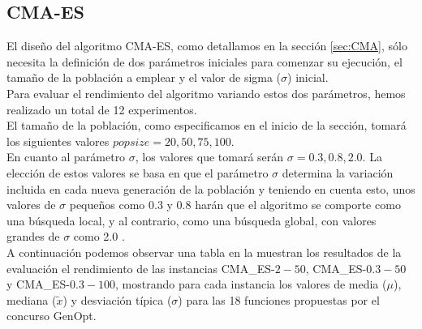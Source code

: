 \newpage
\subsection{CMA-ES}\label{sec:paramCMA_ES}

El diseño del algoritmo CMA-ES, como detallamos en la sección \ref{sec:CMA}, sólo necesita la definición de dos parámetros iniciales para comenzar su ejecución, el tamaño de la población a emplear y el valor de sigma ($\sigma$) inicial. \\ Para evaluar el rendimiento del algoritmo variando estos dos parámetros, hemos realizado un total de 12 experimentos. \\

El tamaño de la población, como especificamos en el inicio de la sección, tomará los siguientes valores $popsize = 20, 50, 75, 100$. \\
En cuanto al parámetro $\sigma$, los valores que tomará serán $\sigma = 0.3, 0.8, 2.0$. La elección de estos valores se basa en que el parámetro $\sigma$ determina la variación incluida en cada nueva generación de la población y teniendo en cuenta esto, unos valores de $\sigma$ pequeños como 0.3 y 0.8 harán que el algoritmo se comporte como una búsqueda local, y al contrario, como una búsqueda global, con valores grandes de $\sigma$ como 2.0 \cite{CMA1}. \\

A continuación podemos observar una tabla en la muestran los resultados de la  evaluación el rendimiento de las instancias CMA\_ES-$2-50$, CMA\_ES-$0.3-50$ y CMA\_ES-$0.3-100$, mostrando para cada instancia los valores de media ($\mu$), mediana ($\tilde{x}$) y desviación típica ($\sigma$) para las 18 funciones propuestas por el concurso GenOpt. \\

